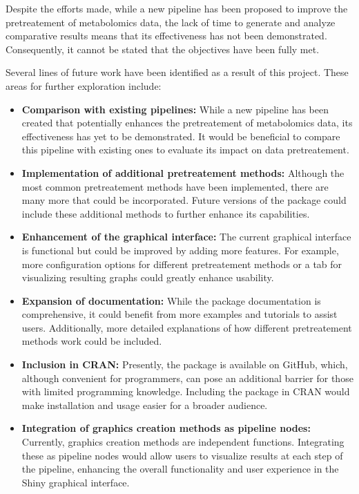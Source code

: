 \documentclass[ENG, BIB]{TFUOC}%
\begin{document}
Despite the efforts made, while a new pipeline has been proposed to improve the pretreatement of metabolomics data, the lack of time to generate and analyze comparative results means that its effectiveness has not been demonstrated. Consequently, it cannot be stated that the objectives have been fully met.

Several lines of future work have been identified as a result of this project. These areas for further exploration include:
\begin{itemize}
    \item \textbf{Comparison with existing pipelines:} While a new pipeline has been created that potentially enhances the pretreatement of metabolomics data, its effectiveness has yet to be demonstrated. It would be beneficial to compare this pipeline with existing ones to evaluate its impact on data pretreatement.
    \item \textbf{Implementation of additional pretreatement methods:} Although the most common pretreatement methods have been implemented, there are many more that could be incorporated. Future versions of the package could include these additional methods to further enhance its capabilities.
    \item \textbf{Enhancement of the graphical interface:} The current graphical interface is functional but could be improved by adding more features. For example, more configuration options for different pretreatement methods or a tab for visualizing resulting graphs could greatly enhance usability.
    \item \textbf{Expansion of documentation:} While the package documentation is comprehensive, it could benefit from more examples and tutorials to assist users. Additionally, more detailed explanations of how different pretreatement methods work could be included.
    \item \textbf{Inclusion in CRAN:} Presently, the package is available on GitHub, which, although convenient for programmers, can pose an additional barrier for those with limited programming knowledge. Including the package in CRAN would make installation and usage easier for a broader audience.
    \item \textbf{Integration of graphics creation methods as pipeline nodes:} Currently, graphics creation methods are independent functions. Integrating these as pipeline nodes would allow users to visualize results at each step of the pipeline, enhancing the overall functionality and user experience in the Shiny graphical interface.
\end{itemize}
\end{document}
